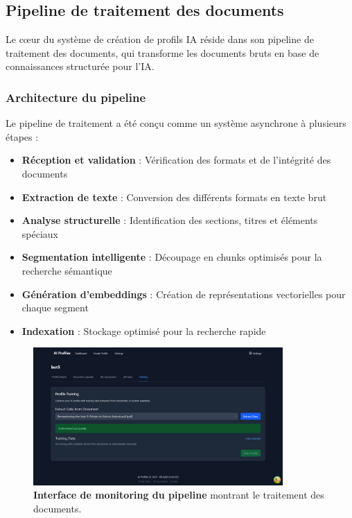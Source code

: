 \subsection{Pipeline de traitement des documents}

Le cœur du système de création de profils IA réside dans son pipeline de traitement des documents, qui transforme les documents bruts en base de connaissances structurée pour l'IA.

\subsubsection{Architecture du pipeline}

Le pipeline de traitement a été conçu comme un système asynchrone à plusieurs étapes :

\begin{itemize}
  \item \textbf{Réception et validation} : Vérification des formats et de l'intégrité des documents
  
  \item \textbf{Extraction de texte} : Conversion des différents formats en texte brut
  
  \item \textbf{Analyse structurelle} : Identification des sections, titres et éléments spéciaux
  
  \item \textbf{Segmentation intelligente} : Découpage en chunks optimisés pour la recherche sémantique
  
  \item \textbf{Génération d'embeddings} : Création de représentations vectorielles pour chaque segment
  
  \item \textbf{Indexation} : Stockage optimisé pour la recherche rapide
\end{itemize}

\begin{figure}[H]
  \centering
  \includegraphics[width=0.85\textwidth,keepaspectratio]{pfe-pics/ai-profile-creation/Screenshot 2025-06-09 at 23-18-42 Vite React TS.png}
  \caption{\textbf{Interface de monitoring du pipeline} montrant le traitement des documents.}
  \label{fig:pipeline_monitoring}
\end{figure}

